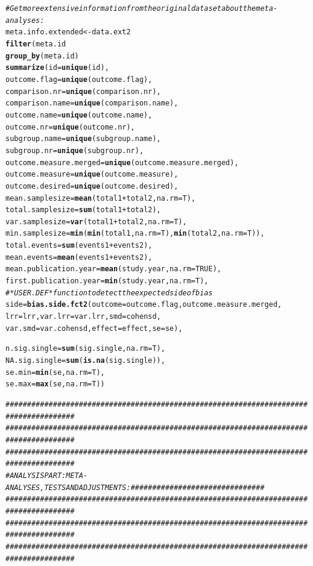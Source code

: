 \documentclass[11pt,a4paper,twoside]{book}\usepackage[]{graphicx}\usepackage[]{color}
\makeatletter
\newcommand{\hlcom}[1]{\textcolor[rgb]{0.678,0.584,0.686}{\textit{#1}}}%
\newcommand{\hlkwd}[1]{\textcolor[rgb]{0.737,0.353,0.396}{\textbf{#1}}}%
\newenvironment{kframe}{%
 \def\at@end@of@kframe{}%
 \ifinner\ifhmode%
  \def\at@end@of@kframe{\end{minipage}}%
  \begin{minipage}{\columnwidth}%
 \fi\fi%
 \def\FrameCommand##1{\hskip\@totalleftmargin \hskip-\fboxsep
 \colorbox{shadecolor}{##1}\hskip-\fboxsep
     \hskip-\linewidth \hskip-\@totalleftmargin \hskip\columnwidth}%
 \MakeFramed {\advance\hsize-\width
   \@totalleftmargin\z@ \linewidth\hsize
   \@setminipage}}%
 {\par\unskip\endMakeFramed%
 \at@end@of@kframe}
\newenvironment{knitrout}{}{} %
\makeatother
\begin{document}
\begin{knitrout}
\begin{kframe}
\begin{alltt}
\hlcom{#Get more extensive information from the original dataset about the meta-analyses:}
meta.info.extended <- data.ext2 %
  \hlkwd{filter}(meta.id %
  \hlkwd{group_by}(meta.id) %
  \hlkwd{summarize}(id = \hlkwd{unique}(id),
            outcome.flag = \hlkwd{unique}(outcome.flag),
            comparison.nr = \hlkwd{unique}(comparison.nr),
            comparison.name = \hlkwd{unique}(comparison.name),
            outcome.name = \hlkwd{unique}(outcome.name),
            outcome.nr = \hlkwd{unique}(outcome.nr),
            subgroup.name = \hlkwd{unique}(subgroup.name),
            subgroup.nr = \hlkwd{unique}(subgroup.nr),
            outcome.measure.merged = \hlkwd{unique}(outcome.measure.merged),
            outcome.measure = \hlkwd{unique}(outcome.measure),
            outcome.desired = \hlkwd{unique}(outcome.desired),
            mean.samplesize = \hlkwd{mean}(total1 + total2, na.rm = T),
            total.samplesize = \hlkwd{sum}(total1 + total2),
            var.samplesize = \hlkwd{var}(total1 + total2, na.rm = T),
            min.samplesize = \hlkwd{min}(\hlkwd{min}(total1, na.rm = T), \hlkwd{min}(total2, na.rm = T)),
            total.events = \hlkwd{sum}(events1 + events2),
            mean.events = \hlkwd{mean}(events1 + events2),
            mean.publication.year = \hlkwd{mean}(study.year, na.rm = TRUE),
            first.publication.year = \hlkwd{min}(study.year, na.rm = T),
\hlcom{            #*USER.DEF* function to detect the expected side of bias}
            side = \hlkwd{bias.side.fct2}(outcome = outcome.flag, outcome.measure.merged, 
                                  lrr = lrr, var.lrr = var.lrr, smd = cohensd, 
                                  var.smd = var.cohensd, effect = effect, se = se), 

            n.sig.single = \hlkwd{sum}(sig.single, na.rm = T),
            NA.sig.single = \hlkwd{sum}(\hlkwd{is.na}(sig.single)),
            se.min = \hlkwd{min}(se, na.rm = T),
            se.max = \hlkwd{max}(se, na.rm = T))

\hlcom{######################################################################################}
\hlcom{######################################################################################}
\hlcom{######################################################################################}
\hlcom{# ANALYSIS PART: META-ANALYSES, TESTS AND ADJUSTMENTS: ###############################}
\hlcom{######################################################################################}
\hlcom{######################################################################################}
\hlcom{######################################################################################}


\end{alltt}
\end{kframe}
\end{knitrout}
\end{document}
